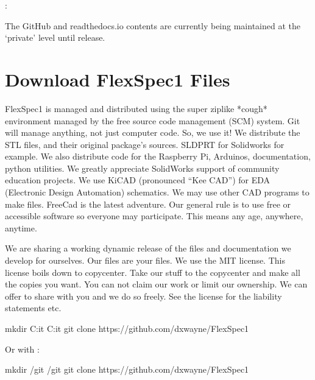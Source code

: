 \documentclass[letterpaper,10pt,english,openany,oneside]{sphinxmanual}
\begin{document}
\sphinxAtStartPar
{}:

\sphinxAtStartPar
The GitHub and readthedocs.io contents are currently being maintained
at the ‘private’ level until release.


\chapter{Download FlexSpec1 Files}
\label{\detokenize{flexspec1:download-flexspec1-files}}\label{\detokenize{flexspec1::doc}}
\sphinxAtStartPar
FlexSpec1 is managed and distributed using the super zip\sphinxhyphen{}like
*cough* environment managed by the free  source code management (SCM)
system. Git will manage anything, not just computer code. So, we use
it! We distribute the STL files, and their original package’s
sources. SLDPRT for Solidworks for example. We also distribute code
for the Raspberry Pi, Arduinos, documentation, python utilities.  We
greatly appreciate SolidWorks support of community education projects.
We use KiCAD (pronounced “Kee CAD”) for EDA (Electronic Design
Automation) schematics. We may use other CAD programs to make
files. FreeCad is the latest adventure. Our general rule is to use
free or accessible software so everyone may participate. This means
any age, anywhere, anytime.

\sphinxAtStartPar
We are sharing a working dynamic release of the files and
documentation we develop for ourselves. Our files are your files. We
use the MIT license. This license boils down to copy\sphinxhyphen{}center. Take our
stuff to the copy\sphinxhyphen{}center and make all the copies you want. You can not
claim our work or limit our ownership. We can offer to share with you
and we do so freely. See the license for the liability statements etc.

\sphinxAtStartPar
{}

\begin{sphinxVerbatim}[commandchars=\\\{\}]
mkdir C:it
 C:it
git clone https://github.com/dxwayne/FlexSpec1
\end{sphinxVerbatim}

\sphinxAtStartPar
Or with :

\begin{sphinxVerbatim}[commandchars=\\\{\}]
mkdir /git
 /git
git clone https://github.com/dxwayne/FlexSpec1
\end{sphinxVerbatim}
\end{document}
